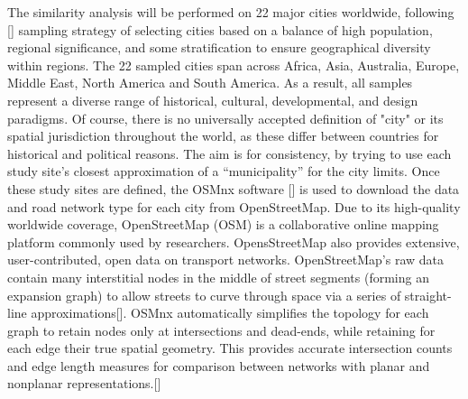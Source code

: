 The similarity analysis will be performed on 22 major cities worldwide, following [\cite{Louf:2014}] sampling strategy of selecting cities based on a balance of high population, regional significance, and some stratification to ensure geographical diversity within regions. The 22 sampled cities span across Africa, Asia, Australia, Europe, Middle East, North America and South America. As a result, all samples represent a diverse range of historical, cultural, developmental, and design paradigms. Of course, there is no universally accepted definition of "city" or its spatial jurisdiction throughout the world, as these differ between countries for historical and political reasons. The aim is for consistency, by trying to use each study site’s closest approximation of a “municipality” for the city limits. Once these study sites are defined, the OSMnx software [\cite{Boeing:2017}] is used to download the data and road network type for each city from OpenStreetMap. Due to its high-quality worldwide coverage, OpenStreetMap (OSM) is a collaborative online mapping platform commonly used by researchers. OpensStreetMap also provides extensive, user-contributed, open data on transport networks. OpenStreetMap’s raw data contain many interstitial nodes in the middle of street segments (forming an expansion graph) to allow streets to curve through space via a series of straight-line approximations[\cite{Boeing:2018}]. OSMnx automatically simplifies the topology for each graph to retain nodes only at intersections and dead-ends, while retaining for each edge their true spatial geometry. This provides accurate intersection counts and edge length measures for comparison between  networks with planar and nonplanar representations.[\cite{Boeing:2017}]

